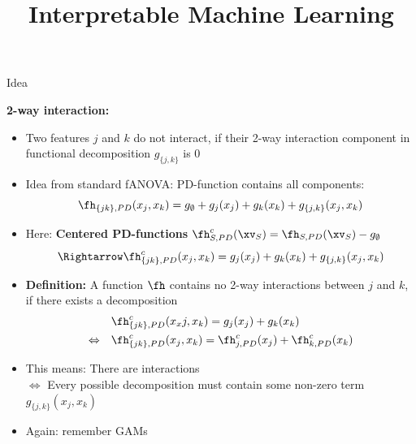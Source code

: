\documentclass[11pt,compress,t,notes=noshow, aspectratio=169, xcolor=table]{beamer}
\title{Interpretable Machine Learning}
\date{}
\begin{document}
\newcommand{\titlefigure}{figure/h-statistic}
\newcommand{\learninggoals}{
\item Friedman's H-statistic with two purposes:
\item Measure general $k$-way interactions between arbitrary features
\item Measure a single feature's overall interaction strength
}




\begin{frame}{Idea }

    \textbf{2-way interaction:}
    \begin{itemize}[<+->]
        \item Two features $j$ and $k$ do not interact, if their 2-way interaction component in functional decomposition $g_{\{j,k\}}$ is 0
        \item Idea from standard fANOVA: PD-function contains all components:
        $$
        \fh_{\{jk\}, PD}(x_j, x_k)
        = g_\emptyset + g_j(x_j) + g_k(x_k) + g_{\{j,k\}}(x_j, x_k)
        $$
        \item Here: \textbf{Centered PD-functions} $\fh_{S,PD}^c(\xv_S) = \fh_{S,PD}(\xv_S) - g_\emptyset$
        $$
        \Rightarrow \fh^c_{\{jk\}, PD}(x_j, x_k)
        = g_j(x_j) + g_k(x_k) + g_{\{j,k\}}(x_j, x_k)
        $$
        \item \textbf{Definition:} A function $\fh$ contains no 2-way interactions between $j$ and $k$, if there exists a decomposition
        \begin{align*}
            & \fh_{\{jk\}, PD}^c(x_xj, x_k)
            = g_j(x_j) + g_k(x_k) \\
            \Leftrightarrow \quad
            & \fh_{\{jk\}, PD}^c(x_j, x_k)
            = \fh^c_{j, PD}(x_j) + \fh^c_{k, PD}(x_k)
        \end{align*}
        \item This means: There are interactions \\
        $\Leftrightarrow$ Every possible decomposition must contain some non-zero term $g_{\{j,k\}}(x_j, x_k)$
        \item Again: remember GAMs
    \end{itemize}
    


\end{frame}
\end{document}
